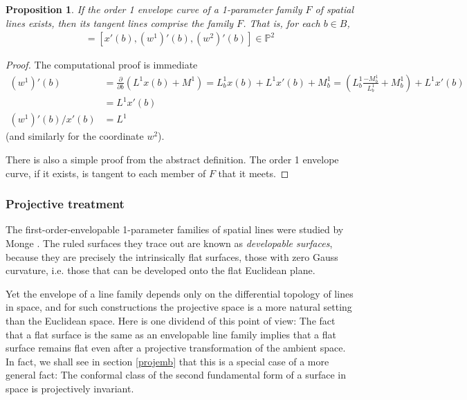 \documentclass[12pt]{article}
\numberwithin{equation}{section}
\theoremstyle{plain}
\newtheorem{proposition}[definition]{Proposition}
\theoremstyle{definition}
\renewcommand{\P}{\mathbb{P}}
\begin{document}
\begin{proposition}\label{tangentdevelopable} If the order 1 envelope curve of a 1-parameter family $F$ of spatial lines exists, then its tangent lines comprise the family $F$. That is, for each $b\in B$,
\begin{align*}
[1,L^{1},L^{2}]=[x'(b),(w^{1})'(b),(w^{2})'(b)]\in \P^{2}
\end{align*}
\end{proposition}
\begin{proof} The computational proof is immediate
\begin{align*}
(w^{1})'(b)&=\frac{\partial}{\partial b}(L^{1}x(b)+M^{1})=L^{1}_{b}x(b)+L^{1}x'(b)+M^{1}_{b}=\left(L^{1}_{b}\frac{-M^{1}_{b}}{L^{1}_{b}}+M^{1}_{b}\right) + L^{1}x'(b)\\
&=L^{1}x'(b)\\
(w^{1})'(b)/x'(b)&=L^{1}
\end{align*}
(and similarly for the coordinate $w^{2}$).

There is also a simple proof from the abstract definition. The order 1 envelope curve, if it exists, is tangent to each member of $F$ that it meets.
\end{proof}

\subsubsection{Projective treatment}\label{projtreat}
The first-order-envelopable 1-parameter families of spatial lines were studied by Monge \cite{monge}. The ruled surfaces they trace out are known as \emph{developable surfaces}, because they are precisely the intrinsically flat surfaces, those with zero Gauss curvature, i.e. those that can be developed onto the flat Euclidean plane.

Yet the envelope of a line family depends only on the differential topology of lines in space, and for such constructions the projective space is a more natural setting than the Euclidean space. Here is one dividend of this point of view: The fact that a flat surface is the same as an envelopable line family implies that a flat surface remains flat even after a projective transformation of the ambient space. In fact, we shall see in section \ref{projemb} that this is a special case of a more general fact: The conformal class of the second fundamental form of a surface in space is projectively invariant.
\end{document}
